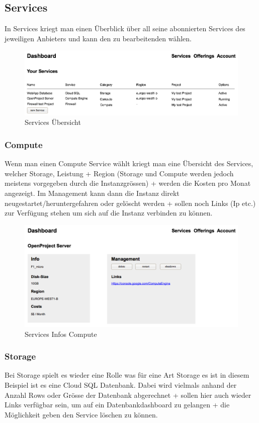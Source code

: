 \subsection{Services}
In Services kriegt man einen Überblick über all seine abonnierten Services des jeweiligen 
Anbieters und kann den zu bearbeitenden wählen.
\begin{figure}[!htbp]
\includegraphics[width=\textwidth]{./03_Analyse/03_Dashboard/images/services_overview}
\caption{Services Übersicht}
\end{figure}

\newpage
\subsubsection{Compute}
Wenn man einen Compute Service wählt kriegt man eine Übersicht des Services, 
welcher Storage, Leistung + Region (Storage und Compute werden jedoch 
meistens vorgegeben durch die Instanzgrössen) + werden die Kosten pro 
Monat angezeigt.
Im Management kann dann die Instanz direkt neugestartet/heruntergefahren oder gelöscht 
werden + sollen noch Links (Ip etc.) zur Verfügung stehen um sich auf die Instanz 
 verbinden zu können.
 
\begin{figure}[!htbp]
\includegraphics[width=\textwidth]{./03_Analyse/03_Dashboard/images/service_info_compute}
\caption{Services Infos Compute}
\end{figure}

\subsubsection{Storage}
Bei Storage spielt es wieder eine Rolle was für eine Art Storage es ist in 
diesem Beispiel ist es eine Cloud SQL Datenbank.
Dabei wird vielmals anhand der Anzahl Rows oder Grösse der Datenbank abgerechnet 
+ sollen hier auch wieder Links verfügbar sein, um auf ein Datenbankdashboard zu 
gelangen + die Möglichkeit geben den Service löschen zu können.

